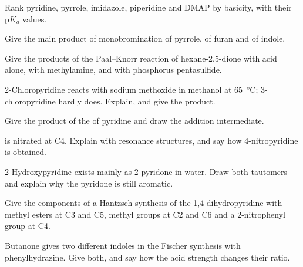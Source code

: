 \begin{exercise}[$\star$]\label{exo:b3:heterocycles:2}
Rank pyridine, pyrrole, imidazole, piperidine and DMAP by basicity, with their
$\mathrm pK_a$ values.
\end{exercise}

\begin{exercise}[$\star$]\label{exo:b3:heterocycles:3}
Give the main product of monobromination of pyrrole, of furan and of indole.
\end{exercise}

\begin{exercise}[$\star$]\label{exo:b3:heterocycles:4}
Give the products of the Paal--Knorr reaction of hexane-2,5-dione with acid alone,
with methylamine, and with phosphorus pentasulfide.
\end{exercise}

\begin{exercise}[$\star\star$]\label{exo:b3:heterocycles:5}
2-Chloropyridine reacts with sodium methoxide in methanol at \qty{65}{\celsius}; 3-chloropyridine
hardly does. Explain, and give the product.
\end{exercise}

\begin{exercise}[$\star\star$]\label{exo:b3:heterocycles:6}
Give the product of the  of pyridine and draw the addition
intermediate.
\end{exercise}

\begin{exercise}[$\star\star$]\label{exo:b3:heterocycles:7}
 is nitrated at C4. Explain with resonance structures, and say how
4-nitropyridine is obtained.
\end{exercise}

\begin{exercise}[$\star\star$]\label{exo:b3:heterocycles:8}
2-Hydroxypyridine exists mainly as 2-pyridone in water. Draw both tautomers and
explain why the pyridone is still aromatic.
\end{exercise}

\begin{exercise}[$\star\star$]\label{exo:b3:heterocycles:9}
Give the components of a Hantzsch synthesis of the 1,4-dihydropyridine with
methyl esters at C3 and C5, methyl groups at C2 and C6 and a 2-nitrophenyl group
at C4.
\end{exercise}

\begin{exercise}[$\star\star\star$]\label{exo:b3:heterocycles:10}
Butanone gives two different indoles in the Fischer synthesis with
phenylhydrazine. Give both, and say how the acid strength changes their ratio.
\end{exercise}


